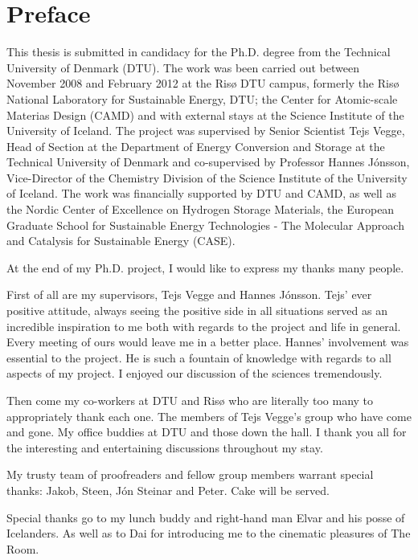\section*{Preface}

This thesis is submitted in candidacy for the Ph.D. degree from the Technical University of Denmark (DTU).
The work was been carried out between November 2008 and February 2012 at the Ris\o{} DTU campus, formerly the Ris\o{} National Laboratory for Sustainable Energy, DTU; the Center for Atomic-scale Materias Design (CAMD) and with external stays at the Science Institute of the University of Iceland.
The project was supervised by Senior Scientist Tejs Vegge, Head of Section at the Department of Energy Conversion and Storage at the Technical University of Denmark and co-supervised by Professor Hannes J\'onsson, Vice-Director of the Chemistry Division of the Science Institute of the University of Iceland.
The work was financially supported by DTU and CAMD, as well as the Nordic Center of Excellence on Hydrogen Storage Materials, the European Graduate School for Sustainable Energy Technologies - The Molecular Approach and Catalysis for Sustainable Energy (CASE).

\vspace{1em}

At the end of my Ph.D. project, I would like to express my thanks many people.

First of all are my supervisors, Tejs Vegge and Hannes J\'onsson.
Tejs' ever positive attitude, always seeing the positive side in all situations served as an incredible inspiration to me both with regards to the project and life in general.
Every meeting of ours would leave me in a better place.
Hannes' involvement was essential to the project.
He is such a fountain of knowledge with regards to all aspects of my project.
I enjoyed our discussion of the sciences tremendously.

Then come my co-workers at DTU and Ris\o{} who are literally too many to appropriately thank each one.
The members of Tejs Vegge's group who have come and gone.
My office buddies at DTU and those down the hall.
I thank you all for the interesting and entertaining discussions throughout my stay.

My trusty team of proofreaders and fellow group members warrant special thanks: Jakob, Steen, J\'on Steinar and Peter.
Cake will be served.

Special thanks go to my lunch buddy and right-hand man Elvar and his posse of Icelanders.
As well as to Da\dh{}i for introducing me to the cinematic pleasures of The Room.

